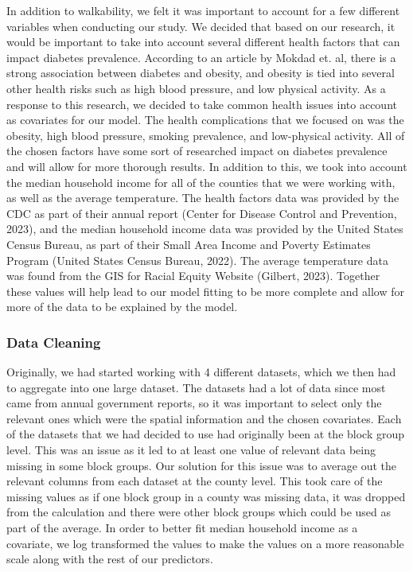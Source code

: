 \documentclass[
]{article}
\begin{document}
In addition to walkability, we felt it was important to account for a
few different variables when conducting our study. We decided that based
on our research, it would be important to take into account several
different health factors that can impact diabetes prevalence. According
to an article by Mokdad et. al, there is a strong association between
diabetes and obesity, and obesity is tied into several other health
risks such as high blood pressure, and low physical activity. As a
response to this research, we decided to take common health issues into
account as covariates for our model. The health complications that we
focused on was the obesity, high blood pressure, smoking prevalence, and
low-physical activity. All of the chosen factors have some sort of
researched impact on diabetes prevalence and will allow for more
thorough results. In addition to this, we took into account the median
household income for all of the counties that we were working with, as
well as the average temperature. The health factors data was provided by
the CDC as part of their annual report (Center for Disease Control and
Prevention, 2023), and the median household income data was provided by
the United States Census Bureau, as part of their Small Area Income and
Poverty Estimates Program (United States Census Bureau, 2022). The
average temperature data was found from the GIS for Racial Equity
Website (Gilbert, 2023). Together these values will help lead to our
model fitting to be more complete and allow for more of the data to be
explained by the model.

\subsubsection{Data Cleaning}\label{data-cleaning}

Originally, we had started working with 4 different datasets, which we
then had to aggregate into one large dataset. The datasets had a lot of
data since most came from annual government reports, so it was important
to select only the relevant ones which were the spatial information and
the chosen covariates. Each of the datasets that we had decided to use
had originally been at the block group level. This was an issue as it
led to at least one value of relevant data being missing in some block
groups. Our solution for this issue was to average out the relevant
columns from each dataset at the county level. This took care of the
missing values as if one block group in a county was missing data, it
was dropped from the calculation and there were other block groups which
could be used as part of the average. In order to better fit median
household income as a covariate, we log transformed the values to make
the values on a more reasonable scale along with the rest of our
predictors.
\end{document}

